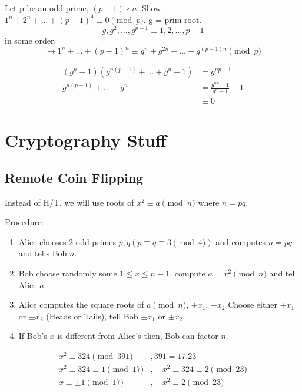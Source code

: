     \subsection{}
    Let p be an odd prime, $(p-1)\nmid n$. 
    Show $1^n+2^n+\dots+(p-1)^4\equiv 0\pmod{p}$. 
    g = prim root. 
    \[
        g,g^2,\dots,g^{p-1}\equiv 1,2,\dots,p-1
    \]
    in some order.
    \[
        \longrightarrow 1^n+\dots+(p-1)^n \equiv g^n + g^{2n} + \dots + g^{(p-1)n} \pmod{p}
    \]

    \begin{align*}
        (g^n - 1)(g^{n(p-1)} + \dots + g^n + 1) &= g^{np-1} \\
        g^{n(p-1)} + \dots + g^n &= \frac{g^{np} - 1}{g^n - 1} - 1 \\
        &\equiv 0
    \end{align*}

\section{Cryptography Stuff}
\subsection{Remote Coin Flipping}
    Instead of H/T, we will use roots of $x^2\equiv a\pmod{n}$ where $n=pq$.

    Procedure: 
    \begin{enumerate}
        \item Alice chooses 2 odd primes $p,q (p\equiv q\equiv 3\pmod{4})$ 
            and computes $n=pq$ and tells Bob $n$. 
        \item Bob choose randomly some $1\le x\le n-1$, compute $a=x^2\pmod{n}$
            and tell Alice $a$. 
        \item Alice computes the square roots of $a\pmod{n}$, $\pm x_1$, $\pm x_2$
            Choose either $\pm x_1$ or $\pm x_2$ (Heads or Tails), 
            tell Bob $\pm x_1$ or $\pm x_2$.
        \item If Bob's $x$ is different from Alice's then, Bob can factor $n$. 
    \end{enumerate}

    \begin{align*}
        x^2\equiv 324\pmod{391}&, 391 = 17.23 \\
        x^2\equiv 324\equiv 1\pmod{17} &,\quad x^2\equiv 324\equiv 2\pmod{23} \\
        x\equiv \pm 1\pmod{17} &,\quad x^2\equiv 2\pmod{23}
    \end{align*}

